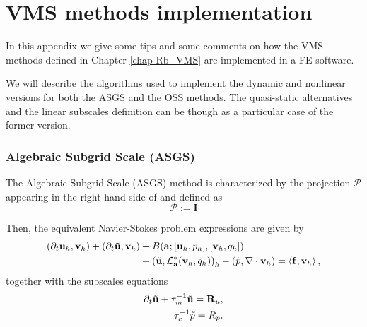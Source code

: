 
\chapter{VMS methods implementation} %
\label{appendix-VMS_implementation}

In this appendix we give some tips and some comments on how the VMS methods defined in Chapter \ref{chap-Rb_VMS} are implemented in a FE software.

We will describe the algorithms used to implement the dynamic and nonlinear versions for both the ASGS and the OSS methods. The quasi-static alternatives and the linear subscales definition can be though as a particular case of the former version.

\subsection*{Algebraic Subgrid Scale (ASGS)}
The Algebraic Subgrid Scale (ASGS) method is characterized by the projection $\mathcal{P}$ appearing in the right-hand side of  and  defined as
\begin{equation}
\label{4}
\mathcal{P}:=\mathbf{I}
\end{equation}

Then, the equivalent Navier-Stokes problem expressions are given by
\begin{align}
\label{5}
(\partial_t{\bf u}_h,{\bf v}_h)+(\partial_t\tilde{{\bf u}},{\bf v}_h)&+B({\bf a};[{\bf u}_h,p_h],[{\bf v}_h,q_h])\\\nonumber
&+\left(\tilde{{\bf u}},\mathcal{L}_{{\bf a}}^*({\bf v}_h,q_h)\right)_h-\left(\tilde{p},\nabla\cdot{\bf v}_h\right)=\left<{\bf f},{\bf v}_h\right>,
\end{align}
together with the subscales equations
\begin{align}
\label{eq-A2_velo_asgs}
\partial_t\tilde{{\bf u}}+\tau_m^{-1}\tilde{{\bf u}}={\bf R}_u,\\
\label{eq-A2_press_asgs}
\tau_c^{-1}\tilde{p}=R_p.
\end{align}

